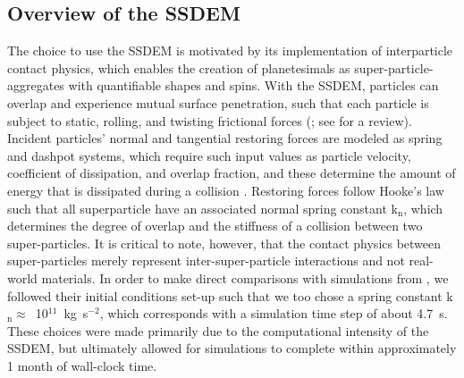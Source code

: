 \documentclass[fleqn,usenatbib]{mnras}
\begin{document}
\subsection{Overview of the SSDEM}\label{sec:SSDEM}
The choice to use the SSDEM is motivated by its implementation of interparticle contact physics, which enables the creation of planetesimals as super-particle-aggregates with quantifiable shapes and spins. With the SSDEM, particles can overlap and experience mutual surface penetration, such that each particle is subject to static, rolling, and twisting frictional forces (\citealp{Schwartz2012,Zhang2017}; see \citealp{Barnes2025} for a review). Incident particles’ normal and tangential restoring forces are modeled as spring and dashpot systems, which require such input values as particle velocity, coefficient of dissipation, and overlap fraction, and these determine the amount of energy that is dissipated during a collision \citep{Cundall1978,Schwartz2012}. Restoring forces follow Hooke’s law such that all superparticle have an associated normal spring constant k$_\text{n}$, which determines the degree of overlap and the stiffness of a collision between two super-particles. It is critical to note, however, that the contact physics between super-particles merely represent inter-super-particle interactions and not real-world materials. In order to make direct comparisons with simulations from \citet{Barnes2025}, we followed their initial conditions set-up such that we too chose a spring constant k$_\text{n}\approx$~10$^{11}$~kg~s$^{-2}$, which corresponds with a simulation time step of about 4.7~s. These choices were made primarily due to the computational intensity of the SSDEM, but ultimately allowed for simulations to complete within approximately 1 month of wall-clock time.
\end{document}

